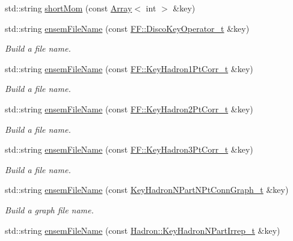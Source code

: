\begin{DoxyCompactItemize}
std\+::string \mbox{\hyperlink{namespaceHadron_aaaec62d26ea28ccc4d611b4797a1d667}{short\+Mom}} (const \mbox{\hyperlink{classXMLArray_1_1Array}{Array}}$<$ int $>$ \&key)
\item 
std\+::string \mbox{\hyperlink{namespaceHadron_ae52edd7538c484e9f1c59f65a1d010ca}{ensem\+File\+Name}} (const \mbox{\hyperlink{structFF_1_1DiscoKeyOperator__t}{F\+F\+::\+Disco\+Key\+Operator\+\_\+t}} \&key)
\begin{DoxyCompactList}\small\item\em Build a file name. \end{DoxyCompactList}\item 
std\+::string \mbox{\hyperlink{namespaceHadron_af97a705730e771598736c0ddcec48fea}{ensem\+File\+Name}} (const \mbox{\hyperlink{structFF_1_1KeyHadron1PtCorr__t}{F\+F\+::\+Key\+Hadron1\+Pt\+Corr\+\_\+t}} \&key)
\begin{DoxyCompactList}\small\item\em Build a file name. \end{DoxyCompactList}\item 
std\+::string \mbox{\hyperlink{namespaceHadron_a031dddf6856dd71ac8114cf9c4106268}{ensem\+File\+Name}} (const \mbox{\hyperlink{structFF_1_1KeyHadron2PtCorr__t}{F\+F\+::\+Key\+Hadron2\+Pt\+Corr\+\_\+t}} \&key)
\begin{DoxyCompactList}\small\item\em Build a file name. \end{DoxyCompactList}\item 
std\+::string \mbox{\hyperlink{namespaceHadron_a1043f4c7b4a30f750e2484e69ff0a25b}{ensem\+File\+Name}} (const \mbox{\hyperlink{structFF_1_1KeyHadron3PtCorr__t}{F\+F\+::\+Key\+Hadron3\+Pt\+Corr\+\_\+t}} \&key)
\begin{DoxyCompactList}\small\item\em Build a file name. \end{DoxyCompactList}\item 
std\+::string \mbox{\hyperlink{namespaceHadron_a427c61121d387abc689b090161709921}{ensem\+File\+Name}} (const \mbox{\hyperlink{structHadron_1_1KeyHadronNPartNPtConnGraph__t}{Key\+Hadron\+N\+Part\+N\+Pt\+Conn\+Graph\+\_\+t}} \&key)
\begin{DoxyCompactList}\small\item\em Build a graph file name. \end{DoxyCompactList}\item 
std\+::string \mbox{\hyperlink{namespaceHadron_a21a0c1cea8de6f0c457f10e22cd3d251}{ensem\+File\+Name}} (const \mbox{\hyperlink{structHadron_1_1KeyHadronNPartIrrep__t}{Hadron\+::\+Key\+Hadron\+N\+Part\+Irrep\+\_\+t}} \&key)

\end{DoxyCompactItemize}
